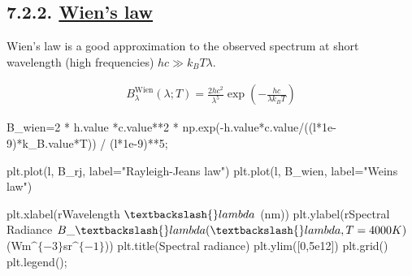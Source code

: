 \documentclass[
  letterpaper,
  DIV=11,
  numbers=noendperiod]{scrreprt}
\newenvironment{Shaded}{\begin{snugshade}}{\end{snugshade}}
\newcommand{\DecValTok}[1]{\textcolor[rgb]{0.68,0.00,0.00}{#1}}
\newcommand{\FloatTok}[1]{\textcolor[rgb]{0.68,0.00,0.00}{#1}}
\newcommand{\NormalTok}[1]{\textcolor[rgb]{0.00,0.23,0.31}{#1}}
\newcommand{\OperatorTok}[1]{\textcolor[rgb]{0.37,0.37,0.37}{#1}}
\newcommand{\StringTok}[1]{\textcolor[rgb]{0.13,0.47,0.30}{#1}}
\newcommand{\VerbatimStringTok}[1]{\textcolor[rgb]{0.13,0.47,0.30}{#1}}
\begin{document}
\hypertarget{wiens-law}{%
\subsection{\texorpdfstring{7.2.2. \protect\hyperlink{toc0_}{Wien's
law}}{7.2.2. Wien's law}}\label{wiens-law}}

Wien's law is a good approximation to the observed spectrum at short
wavelength (high frequencies) \(hc\gg k_BT\lambda\).

\begin{align}
B_\lambda^\mathrm{Wien}(\lambda; T) = \frac{2 hc^2}{\lambda^5}\exp\left(-\frac{hc}{\lambda k_B T}\right)
\end{align}

\begin{Shaded}
\begin{Highlighting}[]
\NormalTok{B\_wien}\OperatorTok{=}\DecValTok{2} \OperatorTok{*}\NormalTok{ h.value }\OperatorTok{*}\NormalTok{c.value}\OperatorTok{**}\DecValTok{2} \OperatorTok{*}\NormalTok{ np.exp(}\OperatorTok{{-}}\NormalTok{h.value}\OperatorTok{*}\NormalTok{c.value}\OperatorTok{/}\NormalTok{((l}\OperatorTok{*}\FloatTok{1e{-}9}\NormalTok{)}\OperatorTok{*}\NormalTok{k\_B.value}\OperatorTok{*}\NormalTok{T)) }\OperatorTok{/}\NormalTok{ (l}\OperatorTok{*}\FloatTok{1e{-}9}\NormalTok{)}\OperatorTok{**}\DecValTok{5}\OperatorTok{;}
\end{Highlighting}
\end{Shaded}

\begin{Shaded}
\begin{Highlighting}[]
\NormalTok{plt.plot(l, B\_rj, label}\OperatorTok{=}\StringTok{"Rayleigh{-}Jeans law"}\NormalTok{)}
\NormalTok{plt.plot(l, B\_wien, label}\OperatorTok{=}\StringTok{"Wein\textquotesingle{}s law"}\NormalTok{)}

\NormalTok{plt.xlabel(}\VerbatimStringTok{r\textquotesingle{}Wavelength $\textbackslash{}lambda$ (nm)\textquotesingle{}}\NormalTok{)}
\NormalTok{plt.ylabel(}\VerbatimStringTok{r\textquotesingle{}Spectral Radiance $B\_\textbackslash{}lambda(\textbackslash{}lambda, T=4000K)$ (Wm$\^{}\{{-}3\}$sr$\^{}\{{-}1\}$)\textquotesingle{}}\NormalTok{)}
\NormalTok{plt.title(}\StringTok{\textquotesingle{}Spectral radiance\textquotesingle{}}\NormalTok{)}
\NormalTok{plt.ylim([}\DecValTok{0}\NormalTok{,}\FloatTok{5e12}\NormalTok{])}
\NormalTok{plt.grid()}
\NormalTok{plt.legend()}\OperatorTok{;}
\end{Highlighting}
\end{Shaded}
\end{document}

